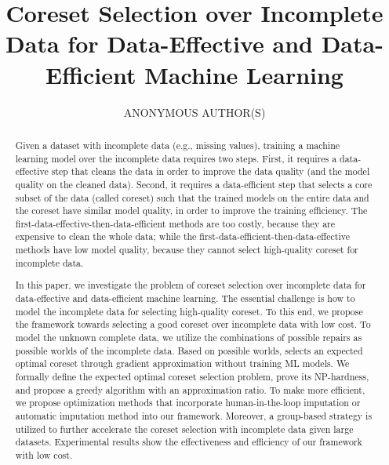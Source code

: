 \documentclass[manuscript,screen]{acmart}
\begin{document}
\title{Coreset Selection over Incomplete Data for Data-Effective and Data-Efficient Machine Learning}

\author{ANONYMOUS AUTHOR(S)}
\authorsaddresses{}


\begin{abstract}
Given a dataset with incomplete data (e.g., missing values), training a machine learning model over the incomplete data requires two steps. First,  it requires a data-effective step that cleans the data in order to improve the data quality (and the model quality on the cleaned data). Second, it requires a data-efficient step that selects a core subset of the data (called coreset) such that the trained models on the entire data and the coreset have similar model quality, in order to improve the training efficiency. The first-data-effective-then-data-efficient methods are too costly, because they are expensive to clean the whole data; while the first-data-efficient-then-data-effective methods have low model quality, because they cannot select high-quality coreset for incomplete data.
	
In this paper, we investigate the problem of coreset selection over incomplete data for data-effective and data-efficient machine learning. The essential challenge is how to model the incomplete data for selecting high-quality coreset.  To this end, we propose the \ours framework towards selecting a good coreset over incomplete data with low cost. To model the unknown complete data, we utilize the combinations of possible repairs as possible worlds of the incomplete data. 	Based on possible worlds, \ours  selects an expected optimal coreset through gradient approximation without training ML models. We formally define the expected optimal coreset selection problem, prove its NP-hardness, and propose a greedy algorithm with an approximation ratio. To make \ours more efficient, we  propose optimization methods that incorporate human-in-the-loop imputation or automatic imputation method into our framework. Moreover, a group-based strategy is utilized to further accelerate the coreset selection with incomplete data given large datasets.
 Experimental results show the effectiveness and efficiency of our framework with low cost.
\end{abstract}
\end{document}
